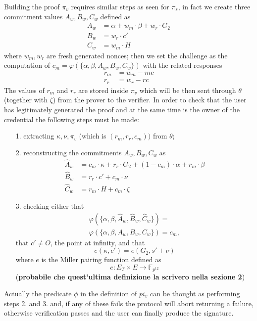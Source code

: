 \documentclass[twocolumn]{article}
\begin{document}
Building the proof $\pi_v$ requires similar steps as seen for $\pi_s$, in fact we create three commitment values $A_w, B_w, C_w$ defined as
\begin{align*}
    A_w &= \alpha + w_m\cdot \beta + w_r \cdot G_2 \\
    B_w &= w_r\cdot c' \\
    C_w &= w_m\cdot H
\end{align*}
where $w_m, w_r$ are fresh generated nonces; then we set the challenge as the computation of $c_m=\varphi(\{\alpha,\beta,A_w,B_w,C_w\})$ with the related responses 
\begin{align*}
    r_m &= w_m - mc \\
    r_r &= w_r - rc
\end{align*}
The values of $r_m$ and $r_r$ are stored inside $\pi_v$ which will be then sent through $\theta$ (together with $\zeta$) from the prover to the verifier. In order to check that the user has legitimately generated the proof and at the same time is the owner of the credential the following steps must be made:
\begin{itemize}
    \item[1.] extracting $\kappa, \nu, \pi_v$ (which is $(r_m,r_r, c_m))$ from $\theta$;
    \item[2.] reconstructing the commitments $A_w, B_w, C_w$ as
    \begin{align*}
        \widehat{A}_w &= c_m\cdot \kappa + r_r\cdot G_2 + (1 - c_m) \cdot\alpha + r_m \cdot \beta \\
        \widehat{B}_w &= r_r\cdot c' + c_m\cdot \nu \\
        \widehat{C}_w &= r_m\cdot H + c_m\cdot \zeta
    \end{align*}
    \item[3.] checking either that
    \begin{multline}\label{challenge pi_v}  \varphi(\{\alpha,\beta,\widehat{A}_w,\widehat{B}_w,\widehat{C}_w\}) = \\ \varphi(\{\alpha,\beta,A_w,B_w,C_w\}) = c_m,
    \end{multline}
    that $c' \ne O$, the point at infinity, and that
    \begin{equation}\label{miller}
    e(\kappa, c') = e(G_2, s' + \nu)
    \end{equation}
    where $e$ is the Miller pairing function defined as
    \[
    e: E_T \times E \to \mathbb{F}_{p^{12}}
    \]
    (\textbf{probabile che quest'ultima definizione la scrivero nella sezione 2})
\end{itemize}
Actually the predicate $\phi$ in the definition of $pi_v$ can be thought as performing steps 2. and 3. and, if any of these fails the protocol will abort returning a failure, otherwise verification passes and the user can finally produce the signature.\\
\end{document}
